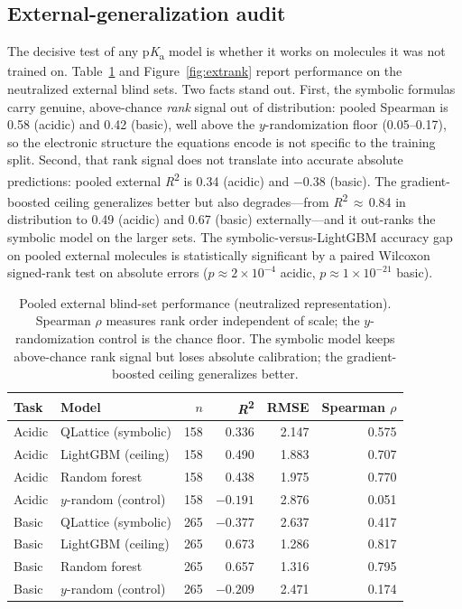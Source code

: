 \documentclass[11pt]{article}
\newcommand{\pka}{p\textit{K}\textsubscript{a}}
\newcommand{\rtwo}{\textit{R}\textsuperscript{2}}
\begin{document}
\subsection{External-generalization audit}

The decisive test of any \pka{} model is whether it works on molecules it was not trained on.
Table~\ref{tab:external} and Figure~\ref{fig:extrank} report performance on the neutralized
external blind sets. Two facts stand out. First, the symbolic formulas carry genuine,
above-chance \emph{rank} signal out of distribution: pooled Spearman is 0.58 (acidic) and 0.42
(basic), well above the $y$-randomization floor (0.05--0.17), so the electronic structure the
equations encode is not specific to the training split. Second, that rank signal does not
translate into accurate absolute predictions: pooled external \rtwo{} is 0.34 (acidic) and
$-0.38$ (basic). The gradient-boosted ceiling generalizes better but also degrades---from
\rtwo{}\,$\approx$\,0.84 in distribution to 0.49 (acidic) and 0.67 (basic) externally---and it
out-ranks the symbolic model on the larger sets. The symbolic-versus-LightGBM accuracy gap on
pooled external molecules is statistically significant by a paired Wilcoxon signed-rank test on
absolute errors ($p\approx2\times10^{-4}$ acidic, $p\approx1\times10^{-21}$ basic).

\begin{table}[t]
\centering
\caption{Pooled external blind-set performance (neutralized representation). Spearman $\rho$
measures rank order independent of scale; the $y$-randomization control is the chance floor.
The symbolic model keeps above-chance rank signal but loses absolute calibration; the
gradient-boosted ceiling generalizes better.}
\label{tab:external}
\small
\begin{tabular}{llrrrr}
\toprule
Task & Model & $n$ & \rtwo{} & RMSE & Spearman $\rho$ \\
\midrule
Acidic & QLattice (symbolic)   & 158 & 0.336 & 2.147 & 0.575 \\
Acidic & LightGBM (ceiling)    & 158 & 0.490 & 1.883 & 0.707 \\
Acidic & Random forest         & 158 & 0.438 & 1.975 & 0.770 \\
Acidic & $y$-random (control)  & 158 & $-0.191$ & 2.876 & 0.051 \\
\midrule
Basic  & QLattice (symbolic)   & 265 & $-0.377$ & 2.637 & 0.417 \\
Basic  & LightGBM (ceiling)    & 265 & 0.673 & 1.286 & 0.817 \\
Basic  & Random forest         & 265 & 0.657 & 1.316 & 0.795 \\
Basic  & $y$-random (control)  & 265 & $-0.209$ & 2.471 & 0.174 \\
\bottomrule
\end{tabular}
\end{table}
\end{document}
